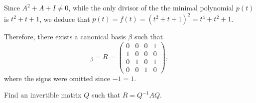 \documentclass[11pt]{scrartcl}
\begin{document}
\begin{soln}
Since $A^2+A+I \neq 0$, while the only divisor of the the minimal
polynomial $p(t)$ is $t^2+t+1$, we deduce that
$p(t)=f(t) = (t^2+t+1)^2 = t^4+t^2+1$.

Therefore, there exists a canonical basis $\beta$ such that
\begin{equation*}
[A]_{\beta} = R =
\begin{pmatrix}
0 & 0 & 0 & 1\\
1 & 0 & 0 & 0\\
0 & 1 & 0 & 1\\
0 & 0 & 1 & 0
\end{pmatrix},
\end{equation*}
where the signs were omitted since $-1 = 1$.

\end{soln}

\begin{problem*}
  \hfill

Find an invertible matrix $Q$ such that $R = Q^{-1}AQ$.
\end{problem*}
\end{document}
